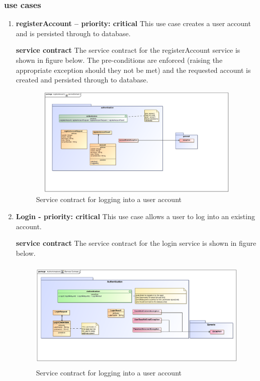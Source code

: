 \documentclass[12pt]{article}
\begin{document}
\subsubsection{use cases}

\begin{enumerate}


\item \textbf{registerAccount  – priority: critical } 
This use case creates  a user account and is persisted through to database.

\par{\textbf{service contract} The service contract for the registerAccount  service is shown in figure below. The pre-conditions are enforced (raising the appropriate exception should they not be met) and the requested account is created and persisted through to database.}
\begin{figure}[h]
		\includegraphics[height=200px, width=500px]{epsImages/Authentication/serviceContract.eps}
		\caption{Service contract for logging into a user account}
\end{figure}
\item \textbf{Login - priority: critical}
This use case allows a user to log into an existing account.

\par{\textbf{service contract} The service contract for the login service is shown in figure below.}
\begin{figure}[h]
		\includegraphics[height=200px, width=500px]{epsImages/Authentication/LoginServiceContract.eps}
		\caption{Service contract for logging into a user account}
\end{figure}


\end{enumerate}
\end{document}
